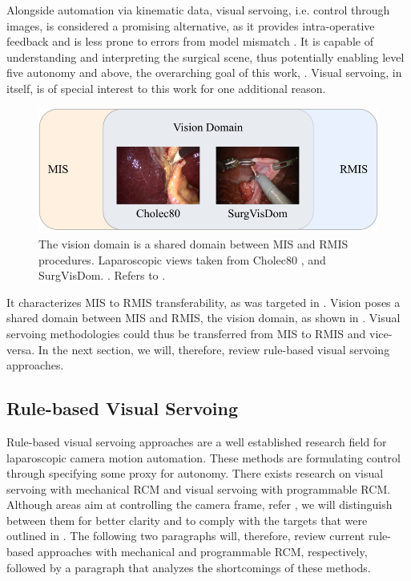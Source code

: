 Alongside automation via kinematic data, visual servoing, i.e. control through images, is considered a promising alternative, as it provides intra-operative feedback \cite{pandya2014review} and is less prone to errors from model mismatch \cite{azizian2014visual}. It is capable of understanding and interpreting the surgical scene, thus potentially enabling level five autonomy and above, the overarching goal of this work, . Visual servoing, in itself, is of special interest to this work for one additional reason.
\begin{figure}
    \centering
    \includegraphics{introduction/fig/shared_domain.pdf}
    \caption{The vision domain is a shared domain between MIS and RMIS procedures. Laparoscopic views taken from Cholec80 \cite{twinanda2016endonet}, and SurgVisDom. \cite{zia2021surgical}. Refers to .}
    \label{in:fig:shared_domain}
\end{figure}
It characterizes MIS to RMIS transferability, as was targeted in . Vision poses a shared domain between MIS and RMIS, the vision domain, as shown in . Visual servoing methodologies could thus be transferred from MIS to RMIS and vice-versa. In the next section, we will, therefore, review rule-based visual servoing approaches.

\subsection{Rule-based Visual Servoing}
\label{in:sec:rule_based_approaches}
Rule-based visual servoing approaches are a well established research field for laparoscopic camera motion automation. These methods are formulating control through specifying some proxy for autonomy. There exists research on visual servoing with mechanical RCM and visual servoing with programmable RCM. Although areas aim at controlling the camera frame, refer , we will distinguish between them for better clarity and to comply with the targets that were outlined in . The following two paragraphs will, therefore, review current rule-based approaches with mechanical and programmable RCM, respectively, followed by a paragraph that analyzes the shortcomings of these methods.

